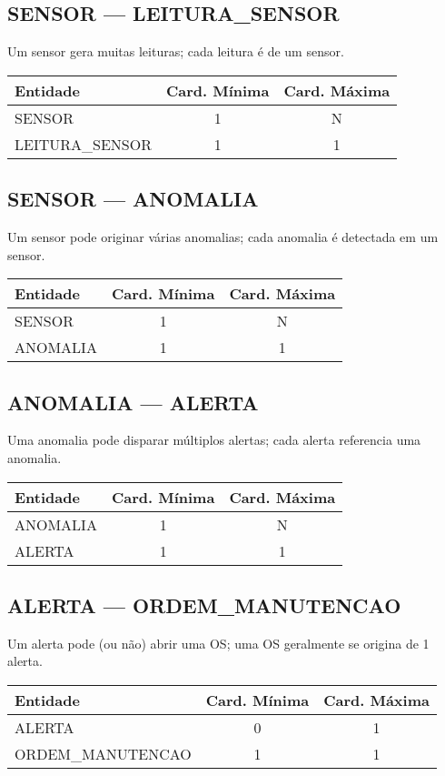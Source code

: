 \documentclass[10pt,a4paper]{article}
\begin{document}
\subsection*{SENSOR — LEITURA\_SENSOR}
Um sensor gera muitas leituras; cada leitura é de um sensor.
\begin{center}
\begin{tabular}{|l|c|c|}
\hline
\rowcolor{vermelhoheader}\color{white}\textbf{Entidade} & \textbf{Card. Mínima} & \textbf{Card. Máxima} \\
\hline
SENSOR & 1 & N \\
LEITURA\_SENSOR & 1 & 1 \\
\hline
\end{tabular}
\end{center}
\hfill
\subsection*{SENSOR — ANOMALIA}
Um sensor pode originar várias anomalias; cada anomalia é detectada em um sensor.
\begin{center}
\begin{tabular}{|l|c|c|}
\hline
\rowcolor{vermelhoheader}\color{white}\textbf{Entidade} & \textbf{Card. Mínima} & \textbf{Card. Máxima} \\
\hline
SENSOR & 1 & N \\
ANOMALIA & 1 & 1 \\
\hline
\end{tabular}
\end{center}
\vspace{0.5cm}

\subsection*{ANOMALIA — ALERTA}
Uma anomalia pode disparar múltiplos alertas; cada alerta referencia uma anomalia.
\begin{center}
\begin{tabular}{|l|c|c|}
\hline
\rowcolor{vermelhoheader}\color{white}\textbf{Entidade} & \textbf{Card. Mínima} & \textbf{Card. Máxima} \\
\hline
ANOMALIA & 1 & N \\
ALERTA & 1 & 1 \\
\hline
\end{tabular}
\end{center}
\hfill
\subsection*{ALERTA — ORDEM\_MANUTENCAO}
Um alerta pode (ou não) abrir uma OS; uma OS geralmente se origina de 1 alerta.
\begin{center}
\begin{tabular}{|l|c|c|}
\hline
\rowcolor{vermelhoheader}\color{white}\textbf{Entidade} & \textbf{Card. Mínima} & \textbf{Card. Máxima} \\
\hline
ALERTA & 0 & 1 \\
ORDEM\_MANUTENCAO & 1 & 1 \\
\hline
\end{tabular}
\end{center}
\vspace{0.5cm}
\end{document}
